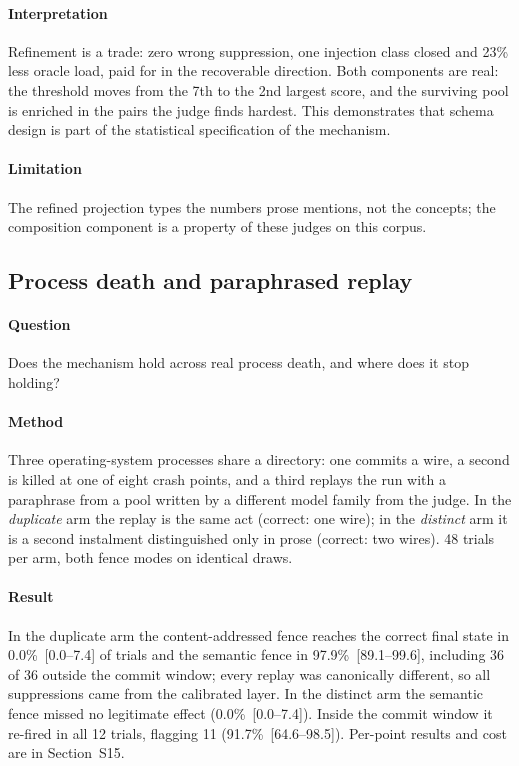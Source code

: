 \paragraph{Interpretation} Refinement is a trade: zero wrong suppression, one injection class closed and 23\% less oracle load, paid for in the recoverable direction. Both components are real: the threshold moves from the 7th to the 2nd largest score, and the surviving pool is enriched in the pairs the judge finds hardest. This demonstrates that schema design is part of the statistical specification of the mechanism.

\paragraph{Limitation} The refined projection types the numbers prose mentions, not the concepts; the composition component is a property of these judges on this corpus.

\subsection{Process death and paraphrased replay}\label{sec:res-crash}

\paragraph{Question} Does the mechanism hold across real process death, and where does it stop holding?

\paragraph{Method} Three operating-system processes share a directory: one commits a wire, a second is killed at one of eight crash points, and a third replays the run with a paraphrase from a pool written by a different model family from the judge. In the \emph{duplicate} arm the replay is the same act (correct: one wire); in the \emph{distinct} arm it is a second instalment distinguished only in prose (correct: two wires). 48 trials per arm, both fence modes on identical draws.

\paragraph{Result} In the duplicate arm the content-addressed fence reaches the correct final state in 0.0\%~[0.0--7.4] of trials and the semantic fence in 97.9\%~[89.1--99.6], including 36 of 36 outside the commit window; every replay was canonically different, so all suppressions came from the calibrated layer. In the distinct arm the semantic fence missed no legitimate effect (0.0\%~[0.0--7.4]). Inside the commit window it re-fired in all 12 trials, flagging 11 (91.7\%~[64.6--98.5]). Per-point results and cost are in Section~S15.

